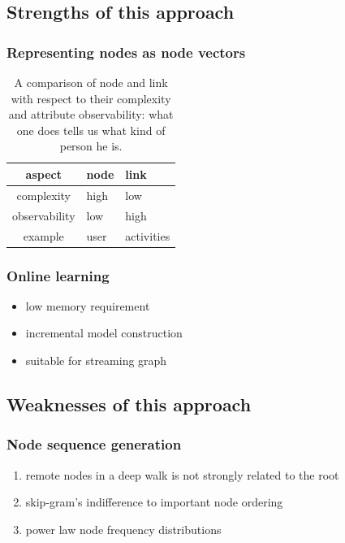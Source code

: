 \documentclass{article}
\begin{document}
\subsection{Strengths of this approach}

\subsubsection{Representing nodes as node vectors}
\begin{table}[H]
	\centering
	\begin{tabularx}{0.5\textwidth}{ |c|X|X| } \hline
		aspect  & node & link \\ \hline
		complexity & high & low \\ \hline
		observability & low & high \\ \hline
		example & user & activities \\ \hline
	\end{tabularx}
	\caption{A comparison of node and link with respect to their complexity and 
	attribute observability: what one does tells us what kind of person he is.}
	\label{tab:nodesVSlinks}
\end{table}

\subsubsection{Online learning}
\begin{itemize}
	\item low memory requirement
	\item incremental model construction
	\item suitable for streaming graph
\end{itemize}

\subsection{Weaknesses of this approach}

\subsubsection{Node sequence generation}
\begin{enumerate}
	\item remote nodes in a deep walk is not strongly related to the root
	\item skip-gram's indifference to important node ordering
	\item power law node frequency distributions
\end{enumerate}
\end{document}
